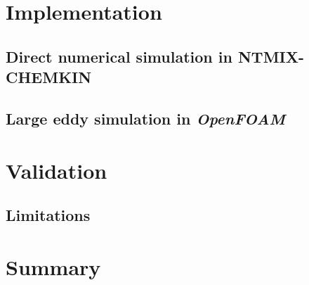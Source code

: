 \section{Implementation}

\subsection{Direct numerical simulation in NTMIX-CHEMKIN}

\subsection{Large eddy simulation in \textit{OpenFOAM}}

\section{Validation}

\subsection{Limitations}

\section{Summary}